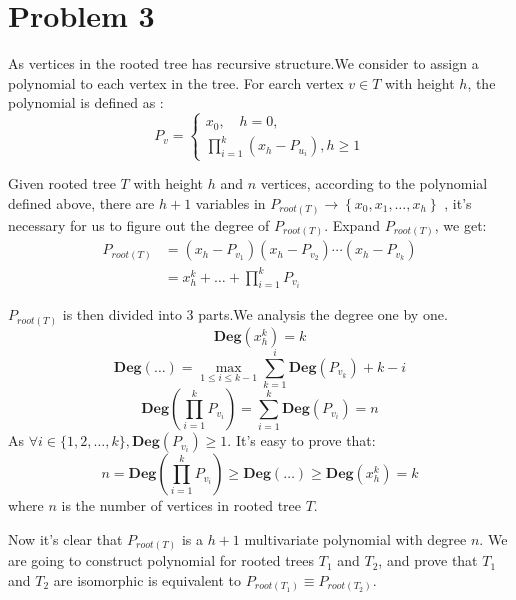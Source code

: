 \documentclass[a4paper, 12pt, titlepage]{article}
\begin{document}
\section{Problem 3}
As vertices in the rooted tree has recursive structure.We consider to assign a polynomial to each vertex in the tree.
For earch vertex $v \in T$ with height $h$, the polynomial is defined as :
\[
    P_{v} = \begin{cases}
        x_{0}, \quad h = 0,  \\
        \prod_{i = 1}^{k} \left( x_{h} - P_{u_{i}} \right), h \geq 1 
    \end{cases}
\]

Given rooted tree $T$ with height $h$ and $n$ vertices, according to the polynomial defined above, there are $h + 1$ variables in $P_{root(T)} \rightarrow \left\{ x_{0}, x_{1}, \ldots, x_{h} \right\}$ , 
it's necessary for us to figure out the degree of $P_{root(T)}$.
Expand $P_{root(T)}$, we get:
\begin{equation}
    \begin{aligned}
        P_{root(T)} &= \left( x_{h} - P_{v_{1}} \right) \left( x_{h} - P_{v_{2}} \right) \cdots \left( x_{h} - P_{v_{k}}\right) \\
                    &= x_{h}^{k} + \ldots + \prod_{i = 1}^{k} P_{v_{i}}
    \end{aligned}
\end{equation}

$P_{root(T)}$ is then divided into 3 parts.We analysis the degree one by one.
\[
    \mathbf{Deg} \left( x_{h}^{k} \right) = k
\]
\[
    \mathbf{Deg} \left( \ldots \right) = \max \limits_{1 \leq i \leq k - 1} \sum_{k = 1}^{i} {\mathbf{Deg} \left( P_{v_{k}} \right)} + k - i
\]
\[
    \mathbf{Deg} \left( \prod_{i = 1}^{k} P_{v_{i}} \right) = \sum_{i = 1}^{k} \mathbf{Deg} \left( P_{v_{i}}\right) = n
\]
As $\forall i \in \{1, 2, \ldots, k \}, \mathbf{Deg} \left( P_{v_{i}} \right) \geq 1$. It's easy to prove that: 
\[
    n = \mathbf{Deg} \left( \prod_{i = 1}^{k} P_{v_{i}} \right) \geq \mathbf{Deg} \left( \ldots \right) \geq \mathbf{Deg} \left( x_{h}^{k} \right) = k
\]
where $n$ is the number of vertices in rooted tree $T$.

Now it's clear that $P_{root(T)}$ is a $h + 1$ multivariate polynomial with degree $n$.
We are going to construct polynomial for rooted trees $T_{1}$ and $T_{2}$, and prove that $T_{1}$ and $T_{2}$ are isomorphic is equivalent to $P_{root(T_{1})} \equiv P_{root(T_{2})}$.
\end{document}
